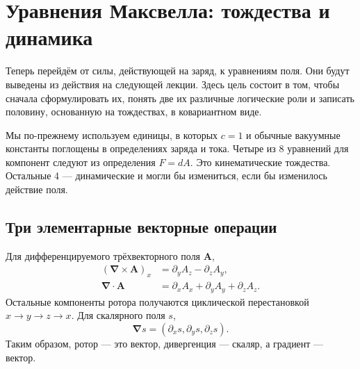 \section{Уравнения Максвелла: тождества и динамика}

Теперь перейдём от силы, действующей на заряд, к уравнениям поля. Они будут выведены из действия на следующей лекции. Здесь цель состоит в том, чтобы сначала сформулировать их, понять две их различные логические роли и записать половину, основанную на тождествах, в ковариантном виде.

\begin{classroomqa}   \end{classroomqa}

\begin{classroomqa}   \end{classroomqa}

Мы по-прежнему используем единицы, в которых \(c=1\) и обычные вакуумные константы поглощены в определениях заряда и тока. Четыре из 8 уравнений для компонент следуют из определения \(F=dA\). Это кинематические тождества. Остальные 4 — динамические и могли бы измениться, если бы изменилось действие поля.

\subsection{Три элементарные векторные операции}

Для дифференцируемого трёхвекторного поля \(\mathbf A\), \begin{align}
(\boldsymbol\nabla\times\mathbf A)_x
&=
\partial_yA_z-\partial_zA_y,
\\
\boldsymbol\nabla\cdot\mathbf A
&=
\partial_xA_x+\partial_yA_y+\partial_zA_z.
\end{align} Остальные компоненты ротора получаются циклической перестановкой \(x\to y\to z\to x\). Для скалярного поля \(s\), \begin{equation}
\boldsymbol\nabla s
=
(\partial_xs,\partial_ys,\partial_zs).
\end{equation} Таким образом, ротор — это вектор, дивергенция — скаляр, а градиент — вектор.

